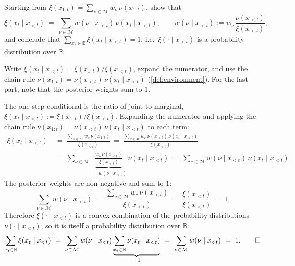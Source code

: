 \documentclass[fontsize=11pt, parskip=half]{scrartcl}
\newcommand{\Mc}{\mathcal{M}}
\begin{document}
\begin{exercise}
\label{prob:one_step_ex}



Starting from $\xi(x_{1:t}) = \sum_{\nu \in \Mc} w_\nu\, \nu(x_{1:t})$, show that
\[
\xi(x_t \mid x_{<t}) ~=~ \sum_{\nu \in \Mc} w(\nu \mid x_{<t})\, \nu(x_t \mid x_{<t}),
\qquad w(\nu \mid x_{<t}) := w_\nu\, \frac{\nu(x_{<t})}{\xi(x_{<t})},
\]
and conclude that $\sum_{x_t \in \mathbb{B}} \xi(x_t \mid x_{<t}) = 1$, i.e.\ $\xi(\cdot \mid x_{<t})$ is a probability distribution over $\mathbb{B}$.

\begin{hint}
Write $\xi(x_t \mid x_{<t}) = \xi(x_{1:t}) / \xi(x_{<t})$, expand the numerator, and use the chain rule $\nu(x_{1:t}) = \nu(x_{<t})\, \nu(x_t \mid x_{<t})$ (\cref{def:environment}). For the last part, note that the posterior weights sum to $1$.
\end{hint}
\end{exercise}

\begin{solution}
The one-step conditional is the ratio of joint to marginal, $\xi(x_t \mid x_{<t}) := \xi(x_{1:t}) / \xi(x_{<t})$. Expanding the numerator and applying the chain rule $\nu(x_{1:t}) = \nu(x_{<t})\, \nu(x_t \mid x_{<t})$ to each term:
\begin{align*}
\xi(x_t \mid x_{<t})
~&=~ \frac{\sum_{\nu \in \Mc} w_\nu\, \nu(x_{1:t})}{\xi(x_{<t})}
~=~ \frac{\sum_{\nu \in \Mc} w_\nu\, \nu(x_{<t})\, \nu(x_t \mid x_{<t})}{\xi(x_{<t})} \\
~&=~ \sum_{\nu \in \Mc} \underbrace{\frac{w_\nu\, \nu(x_{<t})}{\xi(x_{<t})}}_{=\, w(\nu \mid x_{<t})}\, \nu(x_t \mid x_{<t})
~=~ \sum_{\nu \in \Mc} w(\nu \mid x_{<t})\, \nu(x_t \mid x_{<t}).
\end{align*}
The posterior weights are non-negative and sum to $1$:
\[
\sum_{\nu \in \Mc} w(\nu \mid x_{<t})
~=~ \frac{\sum_{\nu \in \Mc} w_\nu\, \nu(x_{<t})}{\xi(x_{<t})}
~=~ \frac{\xi(x_{<t})}{\xi(x_{<t})}
~=~ 1.
\]
Therefore $\xi(\cdot \mid x_{<t})$ is a convex combination of the probability distributions $\nu(\cdot \mid x_{<t})$, so it is itself a probability distribution over $\mathbb{B}$:
\[
\sum_{x_t \in \mathbb{B}} \xi(x_t \mid x_{<t})
~=~ \sum_{\nu \in \Mc} w(\nu \mid x_{<t}) \underbrace{\sum_{x_t \in \mathbb{B}} \nu(x_t \mid x_{<t})}_{=\, 1}
~=~ \sum_{\nu \in \Mc} w(\nu \mid x_{<t})
~=~ 1. \qedhere
\]
\end{solution}
\end{document}
